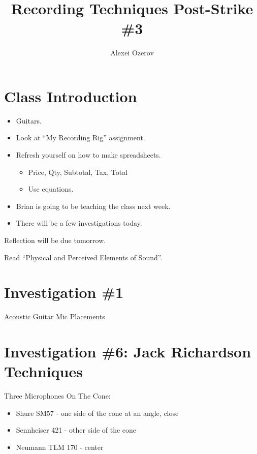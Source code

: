 \documentclass{article}
\title{Recording Techniques Post-Strike \#3}
\author{Alexei Ozerov}
\date{}
\begin{document}
\maketitle

\section{Class Introduction}

\begin{itemize}
\item Guitars.
\item Look at ``My Recording Rig'' assignment.
\item Refresh yourself on how to make spreadsheets.
	\begin{itemize}
	\item Price, Qty, Subtotal, Tax, Total
	\item Use equations.
	\end{itemize}
\item Brian is going to be teaching the class next week.
\item There will be a few investigations today.
\end{itemize}

\medskip

Reflection will be due tomorrow.

\medskip

Read ``Physical and Perceived Elements of Sound''.

\medskip

\section{Investigation \#1}

Acoustic Guitar Mic Placements

\section{Investigation \#6: Jack Richardson Techniques}

Three Microphones On The Cone:

\begin{itemize}
\item Shure SM57 - one side of the cone at an angle, close
\item Sennheiser 421 - other side of the cone 
\item Neumann TLM 170 - center
\end{itemize}
\end{document}
